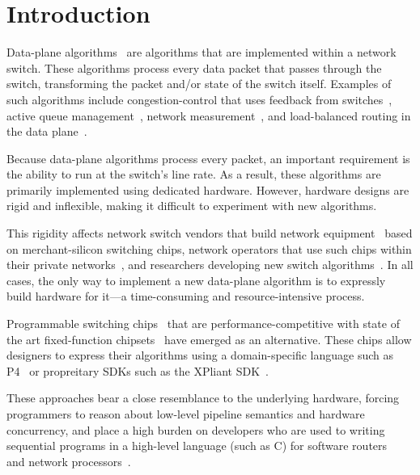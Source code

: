 \section{Introduction}
\label{s:intro}

Data-plane algorithms~\cite{cestan} are algorithms that are implemented within
a network switch. These algorithms process every data packet that passes
through the switch, transforming the packet and/or state of the switch itself.
Examples of such algorithms include congestion-control that uses feedback from
switches~\cite{xcp, rcp, pdq, dctcp}, active queue management~\cite{codel},
network measurement~\cite{opensketch, bitmap_george, elephant_george}, and
load-balanced routing in the data plane~\cite{conga}.

Because data-plane algorithms process every packet, an important requirement is
the ability to run at the switch's line rate.  As a result, these algorithms
are primarily implemented using dedicated hardware. However, hardware designs
are rigid and inflexible, making it difficult to experiment with new
algorithms.

This rigidity affects network switch vendors that build network
equipment~\cite{cisco_nexus, dell_force10, arista_7050} based on
merchant-silicon switching chips,  network operators that use such chips within
their private networks~\cite{jupiter,amazon,isp}, and researchers developing
new switch algorithms~\cite{xcp, codel, d3, detail, pdq}. In all cases, the
only way to implement a new data-plane algorithm is to expressly build hardware
for it---a time-consuming and resource-intensive process.

Programmable switching chips~\cite{flexpipe, xpliant, rmt} that are
performance-competitive with state of the art fixed-function
chipsets~\cite{trident, tomahawk, mellanox} have emerged as an alternative.
These chips allow designers to express their algorithms using a domain-specific
language such as P4~\cite{p4} or propreitary SDKs such as the XPliant
SDK~\cite{xpliant_sdk}.

These approaches bear a close resemblance to the underlying hardware, forcing
programmers to reason about low-level pipeline semantics and hardware
concurrency, and place a high burden on developers who are used to writing
sequential programs in a high-level language (such as C) for software
routers~\cite{click} and network processors~\cite{packetc, ixp, microenginec,
nova}.


